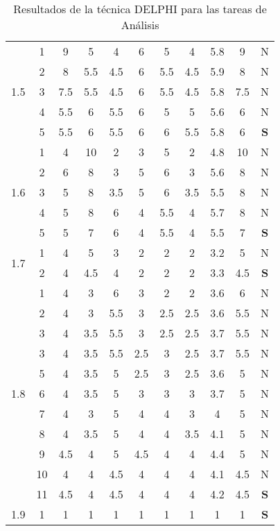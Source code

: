 \documentclass[11pt,a4paper,spanish,twoside]{report}
\begin{document}
\begin{table}[!h]
\begin{tabular}{|c|c||c|c|c|c|c||c|c|c||c|}
    \multirow{5}{*}{1.5} & 1 & 9 & 5 & 4 & 6 & 5 & 4 & 5.8 & 9 & N \\
    & 2 & 8 & 5.5 & 4.5 & 6 & 5.5 & 4.5 & 5.9 & 8 & N \\
    & 3 & 7.5 & 5.5 & 4.5 & 6 & 5.5 & 4.5 & 5.8 & 7.5 & N \\
    & 4 & 5.5 & 6 & 5.5 & 6 & 5 & 5 & 5.6 & 6 & N \\
    & 5 & 5.5 & 6 & 5.5 & 6 & 6 & 5.5 & 5.8 & 6 & \textbf{S} \\
    \hline

    \multirow{5}{*}{1.6} & 1 & 4 & 10 & 2 & 3 & 5 & 2 & 4.8 & 10 & N \\
    & 2 & 6 & 8 & 3 & 5 & 6 & 3 & 5.6 & 8 & N \\
    & 3 & 5 & 8 & 3.5 & 5 & 6 & 3.5 & 5.5 & 8 & N \\
    & 4 & 5 & 8 & 6 & 4 & 5.5 & 4 & 5.7 & 8 & N \\
    & 5 & 5 & 7 & 6 & 4 & 5.5 & 4 & 5.5 & 7 & \textbf{S} \\
    \hline

    \multirow{2}{*}{1.7} & 1 & 4 & 5 & 3 & 2 & 2 & 2 & 3.2 & 5 & N \\
    & 2 & 4 & 4.5 & 4 & 2 & 2 & 2 & 3.3 & 4.5 & \textbf{S} \\
    \hline

    \multirow{11}{*}{1.8} & 1 & 4 & 3 & 6 & 3 & 2 & 2 & 3.6 & 6   & N \\
    & 2 & 4 & 3   & 5.5 & 3   & 2.5 & 2.5 & 3.6 & 5.5 & N \\
    & 3 & 4 & 3.5 & 5.5 & 3   & 2.5 & 2.5 & 3.7 & 5.5 & N \\
    & 3 & 4 & 3.5 & 5.5 & 2.5 & 3   & 2.5 & 3.7 & 5.5 & N \\
    & 5 & 4 & 3.5 & 5   & 2.5 & 3   & 2.5 & 3.6 & 5   & N \\
    & 6 & 4 & 3.5 & 5   & 3   & 3   & 3   & 3.7 & 5   & N \\
    & 7 & 4 & 3   & 5   & 4   & 4   & 3   & 4   & 5   & N \\
    & 8 & 4 & 3.5 & 5   & 4   & 4   & 3.5 & 4.1 & 5   & N \\
    & 9 & 4.5 & 4 & 5 & 4.5 & 4 & 4 & 4.4 & 5 & N \\
    & 10 & 4 & 4 & 4.5 & 4 & 4 & 4 & 4.1 & 4.5 & N \\
    & 11 & 4.5 & 4 & 4.5 & 4 & 4 & 4 & 4.2 & 4.5 & \textbf{S} \\
    \hline

    1.9 & 1 & 1 & 1 & 1 & 1 & 1 & 1 & 1 & 1 & \textbf{S} \\
    \hline
  \end{tabular}
  \caption{Resultados de la técnica DELPHI para las tareas de
    Análisis} \label{Tab:anal}
\end{table}
\end{document}
